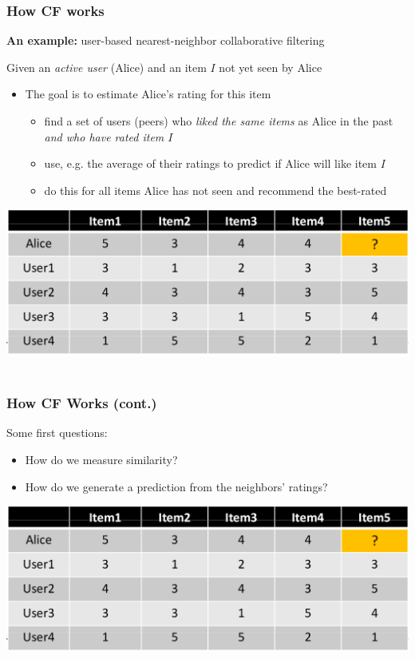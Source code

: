 \documentclass{beamer}
\begin{document}
\begin{frame}
    \frametitle{How CF works}
    \textbf{An example:} user-based nearest-neighbor collaborative filtering

    Given an \emph{active user} (Alice) and an item \emph{$I$} not yet seen by
    Alice
    \begin{itemize}
    \item<+-> The goal is to estimate Alice's rating for this item
        \begin{itemize}
        \item<+-> find a set of users (peers) who \emph{liked the same items} as
            Alice in the past \emph{and who have rated item $I$}
        \item<+-> use, e.g. the average of their ratings to predict if Alice
            will like item $I$
        \item<+-> do this for all items Alice has not seen and recommend the
            best-rated
        \end{itemize}
    \end{itemize}
    \hfill\includegraphics[width=.8\linewidth]{cf}\hfill~
\end{frame}

\begin{frame}
    \frametitle{How CF Works (cont.)}
    Some first questions:
    \begin{itemize}
    \item How do we measure similarity?
    \item How do we generate a prediction from the neighbors' ratings?
    \end{itemize}
    \hfill\includegraphics[width=.8\linewidth]{cf}\hfill~
\end{frame}
\end{document}
